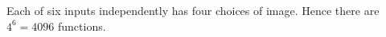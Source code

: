 Each of six inputs independently has four choices of image. Hence there are $4^6=\boxed{4096}$ functions.
